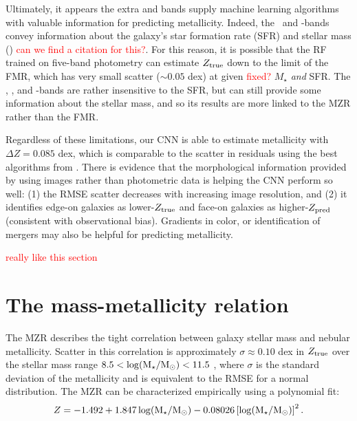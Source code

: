 \documentclass[fleqn,usenatbib]{mnras}
\newcommand{\editorial}[1]{\textcolor{red}{#1}}
\begin{document}
Ultimately, it appears the extra \sdssu and \sdssz bands supply machine learning algorithms with valuable information for predicting metallicity. %
Indeed, the \sdssu\ and \sdssz-bands convey information about the galaxy's star formation rate (SFR) and stellar mass (\mstar) \editorial{can we find a citation for this?}. For this reason, it is possible that the RF trained on five-band photometry can estimate $Z_{\rm true}$ down to the limit of the FMR, which has very small scatter ($\sim 0.05$ dex) at given \editorial{fixed?} $M_{\star}$ \textit{and} SFR. The \sdssg, \sdssr, and \sdssi-bands are rather insensitive to the SFR, but can still provide some information about the stellar mass, and so its results are more linked to the MZR rather than the FMR.

Regardless of these limitations, our CNN is able to estimate metallicity with $\Delta Z = 0.085$ dex, which is comparable to the scatter in residuals using the best algorithms from \cite{Acquaviva2016}. There is evidence that the morphological information provided by using images rather than photometric data is helping the CNN perform so well: (1) the RMSE scatter decreases with increasing image resolution, and (2) it identifies edge-on galaxies as lower-$Z_{\rm true}$ and face-on galaxies as higher-$Z_{\rm pred}$ (consistent with observational bias). Gradients in color, or identification of mergers  may also be helpful for predicting metallicity.

\editorial{really like this section}

\section{The mass-metallicity relation} \label{sec:MZR}
The MZR describes the tight correlation between galaxy stellar mass and nebular metallicity. Scatter in this correlation is approximately $\sigma \approx 0.10$ dex in $Z_{\rm true}$ over the stellar mass range $8.5 < \log (\hbox{M$_{\star}$} / \hbox{$\mathrm{M}_\odot$}) < 11.5$ \citep{Tremonti2004}, where $\sigma$ is the standard deviation of the metallicity and is equivalent to the RMSE for a normal distribution. The MZR can be characterized empirically using a polynomial fit:
\begin{equation}\label{eq:mzr}
Z = -1.492 + 1.847 \log (\hbox{M$_{\star}$} / \hbox{$\mathrm{M}_\odot$}) - 0.08026 \left [\log(\hbox{M$_{\star}$} / \hbox{$\mathrm{M}_\odot$})\right ]^2.
\end{equation}
\end{document}
